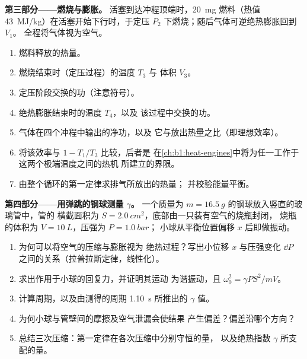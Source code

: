 \begin{problem}
\medskip
\noindent\textbf{第三部分——燃烧与膨胀。}
活塞到达冲程顶端时，\qty{20}{mg} 燃料（热值
\qty{43}{MJ/kg}）在活塞开始下行时，于定压
$P_2$ 下燃烧；随后气体可逆绝热膨胀回到 $V_1$。
全程将气体视为空气。
\begin{enumerate}[resume]
  \item 燃料释放的热量。
  \item 燃烧结束时（定压过程）的温度 $T_3$ 与
        体积 $V_3$。
  \item 定压阶段交换的功（注意符号）。
  \item 绝热膨胀结束时的温度 $T_4$，以及
        该过程中交换的功。
  \item 气体在四个冲程中输出的净功，以及
        它与放出热量之比（即理想效率）。
  \item 将该效率与 $1 - T_1/T_3$ 比较，后者是
        在\cref{ch:b1:heat-engines}中将为任一工作于这两个极端温度之间的热机
        所建立的界限。
  \item 由整个循环的第一定律求排气所放出的热量；
        并校验能量平衡。
\end{enumerate}

\medskip
\noindent\textbf{第四部分——用弹跳的钢球测量 $\gamma$。}
一个质量为 $m = \qty{16.5}{g}$ 的钢球放入竖直的玻璃管中，管的
横截面积为 $S = \qty{2.0}{cm^2}$，底部由一只装有空气的烧瓶封闭，
烧瓶的体积为 $V = \qty{10}{L}$，压强为 $P = \qty{1.0}{bar}$；
小球从平衡位置偏移 $x$ 后即做振动。
\begin{enumerate}[resume]
  \item 为何可以将空气的压缩与膨胀视为
        绝热过程？写出小位移 $x$ 与压强变化
        $\dd P$ 之间的关系（拉普拉斯定律，线性化）。
  \item 求出作用于小球的回复力，并证明其运动
        为谐振动，且 $\omega_0^2 = \gamma PS^2/mV$。
  \item 计算周期，以及由测得的周期 \qty{1.10}{s}
        所推出的 $\gamma$ 值。
  \item 为何小球与管壁间的摩擦及空气泄漏会使结果
        产生偏差？偏差沿哪个方向？
  \item 总结三次压缩：第一定律在各次压缩中分别守恒的量，
        以及绝热指数 $\gamma$
        所支配的量。
\end{enumerate}
\end{problem}
